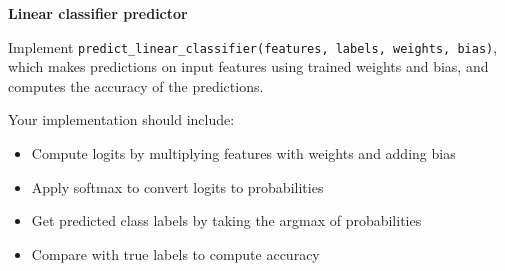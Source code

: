 \item {} \textbf{Linear classifier predictor}

Implement \texttt{predict\_linear\_classifier(features, labels, weights, bias)}, which makes predictions on input features using trained weights and bias, and computes the accuracy of the predictions.

Your implementation should include:
\begin{itemize}
    \item Compute logits by multiplying features with weights and adding bias
    \item Apply softmax to convert logits to probabilities
    \item Get predicted class labels by taking the argmax of probabilities
    \item Compare with true labels to compute accuracy
\end{itemize}